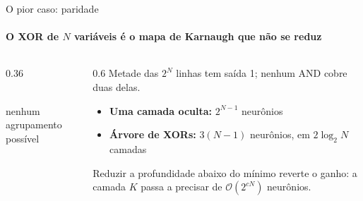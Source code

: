 \documentclass[aspectratio=169, 11pt]{beamer}
\begin{document}
\begin{frame}{O pior caso: paridade}
  \framesubtitle{O XOR de $N$ variáveis é o mapa de Karnaugh que não se reduz}

  \begin{columns}[T]
    \begin{column}{0.36\textwidth}
      \begin{center}
        \\[2pt]
        {\small\color{icCinza} nenhum agrupamento possível}
      \end{center}
    \end{column}
    \begin{column}{0.6\textwidth}
      Metade das $2^N$ linhas tem saída 1; nenhum AND cobre duas delas.

      \smallskip
      \begin{itemize}\setlength{\itemsep}{0.3ex}
        \item \textbf{Uma camada oculta:} $2^{N-1}$ neurônios
        \item \textbf{Árvore de XORs:} $3(N-1)$ neurônios,
              em $2\log_2 N$ camadas
      \end{itemize}

      \medskip

      \smallskip
      {\small Reduzir a profundidade abaixo do mínimo reverte o ganho: a
      camada $K$ passa a precisar de $\mathcal{O}(2^{cN})$ neurônios.}
    \end{column}
  \end{columns}
\end{frame}
\end{document}
